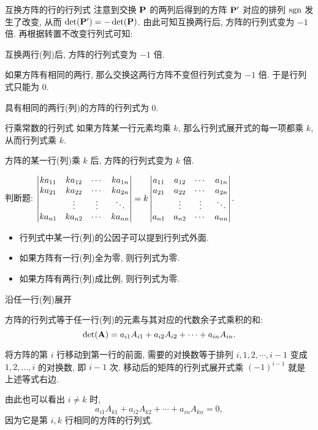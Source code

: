 \begin{frame}{互换方阵的行的行列式}
	\onslide<+->
	注意到交换 ${\mathbf{P}}$ 的两列后得到的方阵 ${\mathbf{P}}'$ 对应的排列 $\operatorname{sgn}$ 发生了改变, 从而 $\det({\mathbf{P}}')=-\det({\mathbf{P}})$.
	\onslide<+->
	由此可知互换两行后, 方阵的行列式变为 $-1$ 倍.
	\onslide<+->
	再根据转置不改变行列式可知:
	\begin{alertblock@}
		互换两行(列)后, 方阵的行列式变为 $-1$ 倍.
	\end{alertblock@}

	\onslide<+->
	如果方阵有相同的两行, 那么交换这两行方阵不变但行列式变为 $-1$ 倍.
	\onslide<+->
	于是行列式只能为 $0$.
	\begin{block@}
		具有相同的两行(列)的方阵的行列式为 $0$.
	\end{block@}
\end{frame}


\begin{frame}{行乘常数的行列式}
	\onslide<+->
	如果方阵某一行元素均乘 $k$, 那么行列式展开式的每一项都乘 $k$, 从而行列式乘 $k$.
	\onslide<+->
	\begin{alertblock@}
		方阵的某一行(列)乘 $k$ 后, 方阵的行列式变为 $k$ 倍.
	\end{alertblock@}
	\onslide<+->
	\begin{exercise}
		判断题: $\left|\begin{matrix}k a_{11}&k a_{12}&\cdots&k a_{1n}\\ka_{21}&ka_{22}&\cdots&k a_{2n}\\&\vdots&\vdots&\ddots\\k a_{n1}&ka_{n2}&\cdots&k a_{nn}\end{matrix}\right|=k\left|\begin{matrix}a_{11}&a_{12}&\cdots&a_{1n}\\a_{21}&a_{22}&\cdots&a_{2n}\\&\vdots&\vdots&\ddots\\a_{n1}&a_{n2}&\cdots&a_{nn}\end{matrix}\right|$. \visible<+->{\Huge\color{red}{$\times$}}
	\end{exercise}
	\onslide<+->
	\begin{block@}
		\begin{itemize}
			\item 行列式中某一行(列)的公因子可以提到行列式外面.
			\item 如果方阵有一行(列)全为零, 则行列式为零.
			\item 如果方阵有两行(列)成比例, 则行列式为零.
		\end{itemize}
	\end{block@}
\end{frame}


\begin{frame}{沿任一行(列)展开}
	\onslide<+->
	\begin{alertblock@}
		方阵的行列式等于任一行(列)的元素与其对应的代数余子式乘积的和:
		\[\det({\mathbf{A}})=a_{i1}A_{i1}+a_{i2}A_{i2}+\cdots+a_{in}A_{in}.\]
	\end{alertblock@}
	\onslide<+->
	将方阵的第 $i$ 行移动到第一行的前面, 需要的对换数等于排列 $i,1,2,\cdots,i-1$ 变成 $1,2,\dots,i$ 的对换数, 即 $i-1$ 次.
	\onslide<+->
	移动后的矩阵的行列式展开式乘 $(-1)^{i-1}$ 就是上述等式右边.
	
	\onslide<+->
	由此也可以看出 $i\neq k$ 时,
	\[a_{i1}A_{k1}+a_{i2}A_{k2}+\cdots+a_{in}A_{kn}=0,\]
	\onslide<+->
	因为它是第 $i,k$ 行相同的方阵的行列式.
\end{frame}



